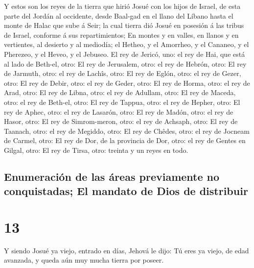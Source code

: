  Y estos son los reyes de la tierra que hirió Josué con
los hijos de Israel, de esta parte del Jordán al occidente, desde
Baal-gad en el llano del Líbano hasta el monte de Halac que sube á Seir;
la cual tierra dió Josué en posesión á las tribus de Israel, conforme á
sus repartimientos;  En montes y en valles, en llanos y en
vertientes, al desierto y al mediodía; el Hetheo, y el Amorrheo, y el
Cananeo, y el Pherezeo, y el Heveo, y el Jebuseo.  El rey
de Jericó, uno: el rey de Hai, que está al lado de Beth-el, otro:
 El rey de Jerusalem, otro: el rey de Hebrón, otro:
 El rey de Jarmuth, otro: el rey de Lachîs, otro:
 El rey de Eglón, otro: el rey de Gezer, otro:
 El rey de Debir, otro: el rey de Geder, otro:
 El rey de Horma, otro: el rey de Arad, otro:
 El rey de Libna, otro: el rey de Adullam, otro:
 El rey de Maceda, otro: el rey de Beth-el, otro:
 El rey de Tappua, otro: el rey de Hepher, otro:
 El rey de Aphec, otro: el rey de Lasarón, otro:
 El rey de Madón, otro: el rey de Hasor, otro:
 El rey de Simrom-meron, otro: el rey de Achsaph, otro:
 El rey de Taanach, otro: el rey de Megiddo, otro:
 El rey de Chêdes, otro: el rey de Jocneam de Carmel,
otro:  El rey de Dor, de la provincia de Dor, otro: el
rey de Gentes en Gilgal, otro:  El rey de Tirsa, otro:
treinta y un reyes en todo.

\hypertarget{enumeraciuxf3n-de-las-uxe1reas-previamente-no-conquistadas-el-mandato-de-dios-de-distribuir}{%
\subsection{Enumeración de las áreas previamente no conquistadas; El
mandato de Dios de
distribuir}\label{enumeraciuxf3n-de-las-uxe1reas-previamente-no-conquistadas-el-mandato-de-dios-de-distribuir}}

\hypertarget{section-12}{%
\section{13}\label{section-12}}

 Y siendo Josué ya viejo, entrado en días, Jehová le dijo:
Tú eres ya viejo, de edad avanzada, y queda aún muy mucha tierra por
poseer.

